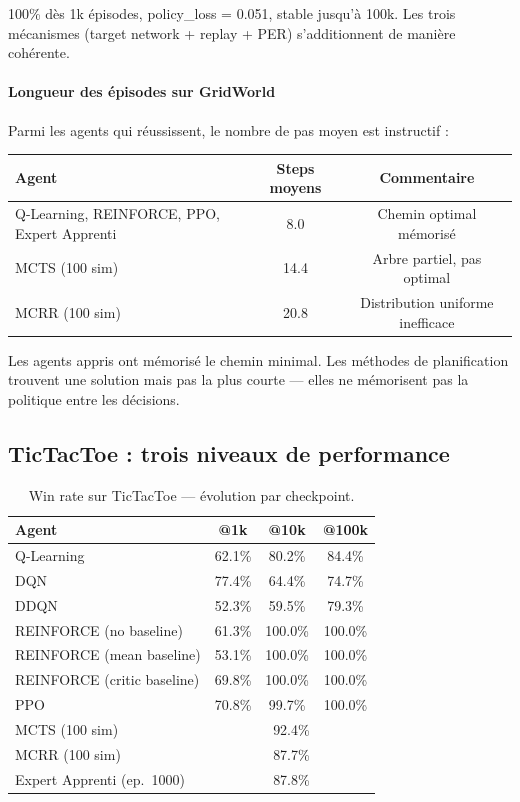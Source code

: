 \documentclass[12pt,a4paper]{article}
\begin{document}
100\% dès 1k épisodes, policy\_loss = 0.051, stable jusqu'à 100k. Les trois mécanismes (target network + replay + PER) s'additionnent de manière cohérente.

\paragraph{Longueur des épisodes sur GridWorld}

Parmi les agents qui réussissent, le nombre de pas moyen est instructif :

\begin{center}
\begin{tabular}{lcc}
\toprule
Agent & Steps moyens & Commentaire \\
\midrule
Q-Learning, REINFORCE, PPO, Expert Apprenti & 8.0 & Chemin optimal mémorisé \\
MCTS (100 sim) & 14.4 & Arbre partiel, pas optimal \\
MCRR (100 sim) & 20.8 & Distribution uniforme inefficace \\
\bottomrule
\end{tabular}
\end{center}

Les agents appris ont mémorisé le chemin minimal. Les méthodes de planification trouvent une solution mais pas la plus courte — elles ne mémorisent pas la politique entre les décisions.

\subsection{TicTacToe : trois niveaux de performance}

\begin{table}[H]
\centering
\caption{Win rate sur TicTacToe — évolution par checkpoint.}
\begin{tabular}{lccc}
\toprule
\textbf{Agent} & \textbf{@1k} & \textbf{@10k} & \textbf{@100k} \\
\midrule
Q-Learning & 62.1\% & 80.2\% & 84.4\% \\
DQN & 77.4\% & 64.4\% & 74.7\% \\
DDQN & 52.3\% & 59.5\% & 79.3\% \\
\midrule
REINFORCE (no baseline) & 61.3\% & 100.0\% & 100.0\% \\
REINFORCE (mean baseline) & 53.1\% & 100.0\% & 100.0\% \\
REINFORCE (critic baseline) & 69.8\% & 100.0\% & 100.0\% \\
PPO & 70.8\% & 99.7\% & 100.0\% \\
\midrule
MCTS (100 sim) & \multicolumn{3}{c}{92.4\%} \\
MCRR (100 sim) & \multicolumn{3}{c}{87.7\%} \\
Expert Apprenti (ep.\ 1000) & \multicolumn{3}{c}{87.8\%} \\
\bottomrule
\end{tabular}
\end{table}
\end{document}
